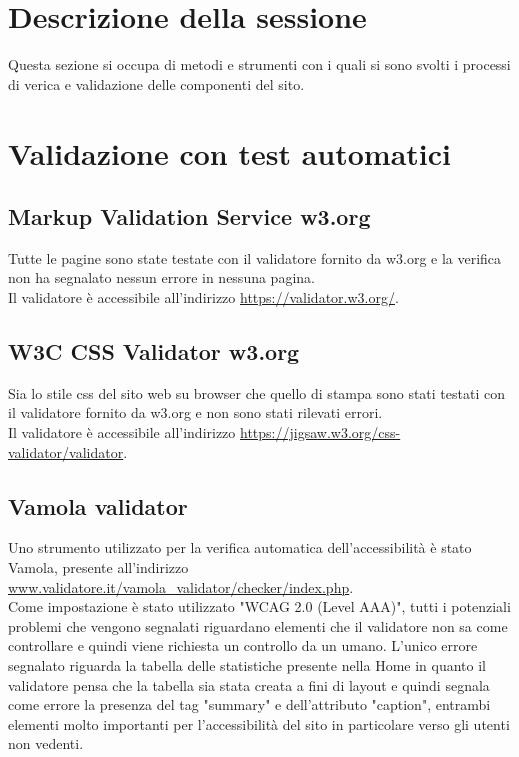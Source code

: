 \documentclass[openany, a4paper, 12pt]{report}
\begin{document}
		\section{Descrizione della sessione}
			Questa sezione si occupa di metodi e strumenti con i quali si sono svolti i processi di verica e validazione delle componenti del sito.
		\section{Validazione con test automatici}
			\subsection{Markup Validation Service w3.org}
				Tutte le pagine sono state testate con il validatore fornito da w3.org e la verifica non ha segnalato nessun errore in nessuna pagina.\\
				Il validatore è accessibile all'indirizzo \url{https://validator.w3.org/}.\\
			\subsection{W3C CSS Validator w3.org}
				Sia lo stile css del sito web su browser che quello di stampa sono stati testati con il validatore fornito da w3.org e non sono stati rilevati errori.\\
Il validatore è accessibile all'indirizzo \url{https://jigsaw.w3.org/css-validator/validator}.\\
			\subsection{Vamola validator}
				Uno strumento utilizzato per la verifica automatica dell'accessibilità è stato Vamola, presente all'indirizzo \url{www.validatore.it/vamola_validator/checker/index.php}.\\
				Come impostazione è stato utilizzato "WCAG 2.0 (Level AAA)", tutti i potenziali problemi che vengono segnalati riguardano elementi che il validatore non sa come controllare e quindi viene richiesta un controllo da un umano.
				L'unico errore segnalato riguarda la tabella delle statistiche presente nella Home in quanto il validatore pensa che la tabella sia stata creata a fini di layout e quindi segnala come errore la presenza del tag "summary" e dell'attributo "caption", entrambi elementi molto importanti per l'accessibilità del sito in particolare verso gli utenti non vedenti.\\
\end{document}
